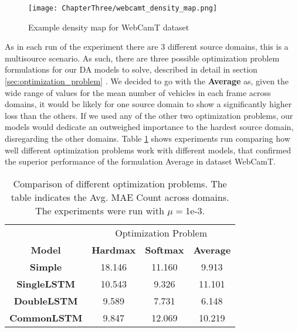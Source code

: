 \begin{figure}[!ht]
	\centering
	\texttt{[image: ChapterThree/webcamt\_density\_map.png]}   
	\caption{Example density map for WebCamT dataset}
	\label{fig:webcamt_density_map}
\end{figure}


As in each run of the experiment there are $3$ different source domains, this is a multisource scenario. As such, there are three possible optimization problem formulations for our DA models to solve, described in detail in section \ref{sec:optimization_problem} . We decided to go with the \textbf{Average} as, given the wide range of values for the mean number of vehicles in each frame across domains, it would be likely for one source domain to show a significantly higher loss than the others. If we used any of the other two optimization problems, our models would dedicate an outweighed importance to the hardest source domain, disregarding the other domains. Table \ref{table:optimization_experiments} shows experiments run comparing how well different optimization problems work with different models, that confirmed the superior performance of the formulation Average in dataset WebCamT.

\begin{table}[!ht]
	\centering
	\begin{tabular}{| c | c | c | c |}
		\cline{2-4}
		\multicolumn{1}{c|}{} & \multicolumn{3}{c|}{Optimization Problem} \\
		\cline{1-4}
		\textbf{Model} & \textbf{Hardmax} & \textbf{Softmax} & \textbf{Average}\\
		\hline
		\textbf{Simple} & 18.146 & 11.160 & 9.913  \\
		\hline 
		\textbf{SingleLSTM} & 10.543 & 9.326 & 11.101  \\
		\hline
		\textbf{DoubleLSTM} & 9.589 & 7.731 & 6.148 \\
		\hline
		\textbf{CommonLSTM} & 9.847 & 12.069 & 10.219 \\
		\hline
	\end{tabular}
	\caption{Comparison of different optimization problems. The table indicates the Avg. MAE Count across domains. The experiments were run with $\mu=$1e-3. }
	\label{table:optimization_experiments}
\end{table}

